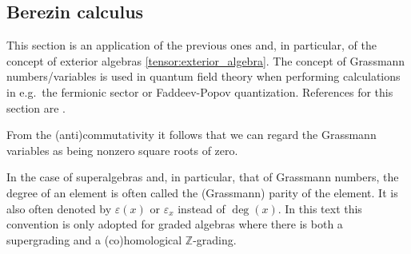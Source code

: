 
\subsection{Berezin calculus}\label{section:berezin}

    This section is an application of the previous ones and, in particular, of the concept of exterior algebras \ref{tensor:exterior_algebra}. The concept of Grassmann numbers/variables is used in quantum field theory when performing calculations in e.g.\ the fermionic sector or Faddeev-Popov quantization. References for this section are \cite{losev_berezin, AMP2}.

    \begin{remark}
        From the (anti)commutativity it follows that we can regard the Grassmann variables as being nonzero square roots of zero.
    \end{remark}

    \begin{notation}[Parity]
        In the case of superalgebras and, in particular, that of Grassmann numbers, the degree of an element is often called the (Grassmann) parity of the element. It is also often denoted by $\varepsilon(x)$ or $\varepsilon_x$ instead of $\deg(x)$. In this text this convention is only adopted for graded algebras where there is both a supergrading and a (co)homological $\mathbb{Z}$-grading.
    \end{notation}

